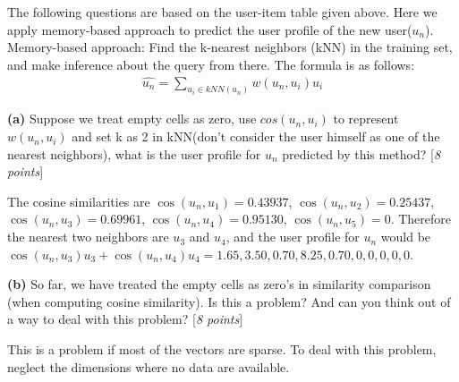 \documentclass[11pt]{article}
\newcounter{marks}
\def\maxmarks#1{\extramark{#1}\addtocounter{marks}{#1}}
\def\extramark#1{\hfill
  [\emph{#1 points}]\\
}
\renewcommand{\part}[1] {\vspace{.10in} {\bf (#1)}}
\begin{document}
The following questions are based on the user-item table given above. Here we apply memory-based approach to predict the user profile of the new user($u_n$).\\
Memory-based approach: Find the k-nearest neighbors (kNN) in the training set, and make inference about the query from there. The formula is as follows:\\
\begin{align*}
\hat{u_n} = \sum_{u_i \in kNN\left(u_n\right)}w(u_n, u_i)u_i
\end{align*}

\part{a}
Suppose we treat empty cells as zero, use $cos(u_n, u_i)$ to represent $w(u_n, u_i)$ and set k as 2 in kNN(don't consider the user himself as one of the nearest neighbors), what is the user profile for $u_n$ predicted by this method?
\maxmarks{8} 

{\color{blue} The cosine similarities are $\cos(u_n,u_1)=0.43937$, $\cos(u_n,u_2)=0.25437$,
$\cos(u_n,u_3)=0.69961$, $\cos(u_n,u_4)=0.95130$, $\cos(u_n,u_5)=0$. Therefore the nearest
two neighbors are $u_3$ and $u_4$, and the user profile for $u_n$ would be 
$\cos(u_n,u_3)u_3+\cos(u_n,u_4)u_4=1.65,3.50,0.70,8.25,0.70,0,0,0,0,0$. }

\part{b}
So far, we have treated the empty cells as zero's in similarity comparison (when computing cosine similarity). Is this a problem? And can you think out of a way to deal with this problem?
\maxmarks{8}

{\color{blue} This is a problem if most of the vectors are sparse. To deal with this problem, 
neglect the dimensions where no data are available. }

\clearpage
\end{document}
